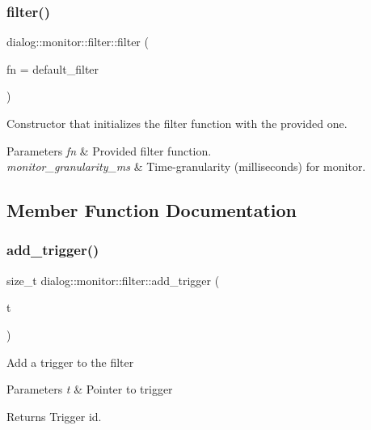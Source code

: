 \subsubsection{\texorpdfstring{filter()}{filter()}\hspace{0.1cm}{\footnotesize\ttfamily [2/2]}}
{\footnotesize\ttfamily dialog\+::monitor\+::filter\+::filter (\begin{DoxyParamCaption}\item[{filter\+\_\+fn}]{fn = {\ttfamily default\+\_\+filter} }\end{DoxyParamCaption})\hspace{0.3cm}{\ttfamily [inline]}}

Constructor that initializes the filter function with the provided one.


\begin{DoxyParams}{Parameters}
{\em fn} & Provided filter function. \\
\hline
{\em monitor\+\_\+granularity\+\_\+ms} & Time-\/granularity (milliseconds) for monitor. \\
\hline
\end{DoxyParams}


\subsection{Member Function Documentation}
\mbox{\label{classdialog_1_1monitor_1_1filter_a6663e4c56880482de42a3366be94356d}} 
\subsubsection{\texorpdfstring{add\+\_\+trigger()}{add\_trigger()}}
{\footnotesize\ttfamily size\+\_\+t dialog\+::monitor\+::filter\+::add\+\_\+trigger (\begin{DoxyParamCaption}\item[{\hyperlink{structdialog_1_1monitor_1_1trigger}{trigger} $\ast$}]{t }\end{DoxyParamCaption})\hspace{0.3cm}{\ttfamily [inline]}}

Add a trigger to the filter


\begin{DoxyParams}{Parameters}
{\em t} & Pointer to trigger \\
\hline
\end{DoxyParams}
\begin{DoxyReturn}{Returns}
Trigger id. 
\end{DoxyReturn}
\mbox{\label{classdialog_1_1monitor_1_1filter_a9e112bf3e11d7a02fdb5d49ed51a9827}} 
